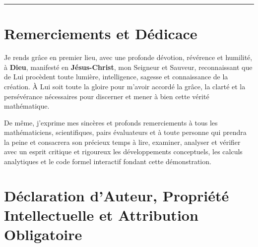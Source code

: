 \documentclass[11pt,a4paper]{article}
\theoremstyle{definition}
\theoremstyle{remark}
\begin{document}
\tableofcontents

\vspace{1.5em}
\hrule
\vspace{1.5em}

\section*{Remerciements et Dédicace}

Je rends grâce en premier lieu, avec une profonde dévotion, révérence et humilité, à \textbf{Dieu}, manifesté en \textbf{Jésus-Christ}, mon Seigneur et Sauveur, reconnaissant que de Lui procèdent toute lumière, intelligence, sagesse et connaissance de la création. À Lui soit toute la gloire pour m'avoir accordé la grâce, la clarté et la persévérance nécessaires pour discerner et mener à bien cette vérité mathématique.

De même, j'exprime mes sincères et profonds remerciements à tous les mathématiciens, scientifiques, pairs évaluateurs et à toute personne qui prendra la peine et consacrera son précieux temps à lire, examiner, analyser et vérifier avec un esprit critique et rigoureux les développements conceptuels, les calculs analytiques et le code formel interactif fondant cette démonstration.

\vspace{1.5em}

\section*{Déclaration d'Auteur, Propriété Intellectuelle et Attribution Obligatoire}
\end{document}
